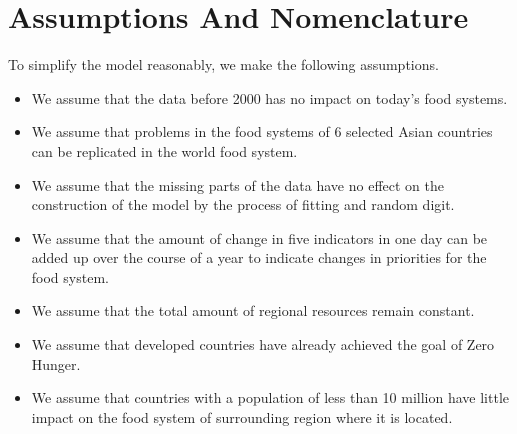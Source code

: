 \documentclass{mcmthesis}
\begin{document}
 \section{Assumptions And Nomenclature}
 To simplify the model reasonably, we make the following assumptions.
 \begin{itemize}
     \item We assume that the data before 2000 has no impact on today's food systems.
     \item We assume that problems in the food systems of 6 selected Asian countries can be replicated in the world food system.
     \item We assume that the missing parts of the data have no effect on the construction of the model by the process of fitting and random digit.
     \item We assume that the amount of change in five indicators in one day can be added up over the course of a year to indicate changes in priorities for the food system.
     \item We assume that the total amount of regional resources remain constant.
     \item We assume that developed countries have already achieved the goal of Zero Hunger.
     \item We assume that countries with a population of less than 10 million have little impact on the food system of surrounding region where it is located.
 \end{itemize}
\end{document}
